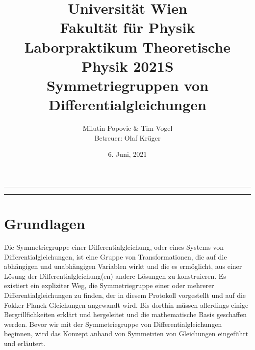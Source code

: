 \documentclass[a4paper]{article}
\title{Universität Wien\\ Fakultät für Physik\\
\vspace{1.25cm}Laborpraktikum Theoretische Physik 2021S \\ Symmetriegruppen von Differentialgleichungen
}
\author{Milutin Popovic \& Tim Vogel \vspace{1cm}\\ Betreuer: Olaf Krüger}
\date{6. Juni, 2021}
\begin{document}
\maketitle
\noindent\rule[0.5ex]{\linewidth}{1pt}
\begin{abstract}
\end{abstract}
\noindent\rule[0.5ex]{\linewidth}{1pt}

\tableofcontents
\section{Grundlagen}
Die Symmetriegruppe einer Differentialgleichung, oder eines Systems von Differentialgleichungen, ist eine Gruppe von Transformationen, die auf die abhängigen und unabhängigen Variablen wirkt und die es ermöglicht, aus einer Lösung der Differentialgleichung(en) andere Lösungen zu konstruieren. Es existiert ein expliziter Weg, die Symmetriegruppe einer oder mehrerer Differentialgleichungen zu finden, der in diesem Protokoll vorgestellt und auf die Fokker-Planck Gleichungen angewandt wird. Bis dorthin müssen allerdings einige Bergrillfichkeiten erklärt und hergeleitet und die mathematische Basis geschaffen werden. Bevor wir mit der Symmetriegruppe von Differentialgleichungen beginnen, wird das Konzept anhand von Symmetrien von Gleichungen eingeführt und erläutert.
\end{document}
